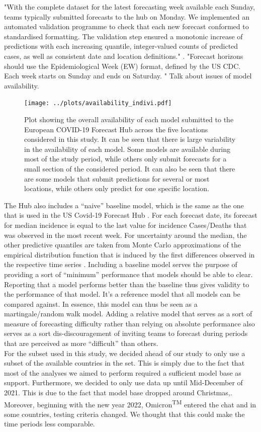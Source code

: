 "With the complete dataset for the latest forecasting week available each Sunday, teams typically
submitted forecasts to the hub on Monday. We implemented an automated validation
programme to check that each new forecast conformed to standardised formatting. The
validation step ensured a monotonic increase of predictions with each increasing quantile,
integer-valued counts of predicted cases, as well as consistent date and location definitions." \citep{sherratt_draft_nodate}.
"Forecast horizons should use the Epidemiological Week (EW) format, defined by the US CDC. Each week starts on Sunday and ends on Saturday. "
Talk about issues of model availability.\\
\begin{figure}
\texttt{[image: ../plots/availability\_indivi.pdf]}
\caption{Plot showing the overall availability of each model submitted to the European COVID-19 Forecast Hub across the five locations considered in this study. It can be seen that there is large variability in the availability of each model. Some models are available during most of the study period, while others only submit forecasts for a small section of the considered period. It can also be seen that there are some models that submit predictions for several or most locations, while others only predict for one specific location.}
\end{figure}
The Hub also includes a ``naive'' baseline model, which is the same as the one that is used in the US Covid-19 Forecast Hub . For each forecast date, its forecast for median incidence is equal to the last value for incidence Cases/Deaths that was observed in the most recent week. For uncertainty around the median, the other predictive quantiles are taken from Monte Carlo approximations of the empirical distribution function that is induced by the first differences observed in the respective time series \citep{cramer_evaluation_2022}. Including a baseline model serves the purpose of providing a sort of ``minimum'' performance that models should be able to clear. Reporting that a model performs better than the baseline thus gives validity to the performance of that model. It's a reference model that all models can be compared against. In essence, this model can thus be seen as a martingale/random walk model. Adding a relative model that serves as a sort of measure of forecasting difficulty rather than relying on absolute performance also serves as a sort dis-discouragement of inviting teams to forecast during periods that are perceived as more ``difficult'' than others.\\
For the subset used in this study, we decided ahead of our study to only use a subset of the available countries in the set. This is simply due to the fact that most of the analyses we aimed to perform required a sufficient model base as support. Furthermore, we decided to only use data up until Mid-December of 2021. This is due to the fact that model base dropped around Christmas,. Moreover, beginning with the new year 2022, Omicron\textsuperscript{TM} entered the chat and in some countries, testing criteria changed. We thought that this could make the time periods less comparable.\\
